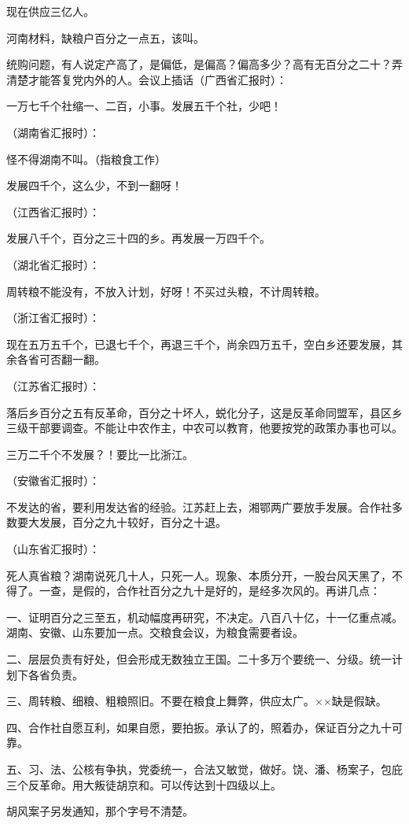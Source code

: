 现在供应三亿人。

河南材料，缺粮户百分之一点五，该叫。

统购问题，有人说定产高了，是偏低，是偏高？偏高多少？高有无百分之二十？弄清楚才能答复党内外的人。会议上插话（广西省汇报时）：

一万七千个社缩一、二百，小事。发展五千个社，少吧！

（湖南省汇报时）：

怪不得湖南不叫。（指粮食工作）

发展四千个，这么少，不到一翻呀！

（江西省汇报时）：

发展八千个，百分之三十四的乡。再发展一万四千个。

（湖北省汇报时）：

周转粮不能没有，不放入计划，好呀！不买过头粮，不计周转粮。

（浙江省汇报时）：

现在五万五千个，已退七千个，再退三千个，尚余四万五千，空白乡还要发展，其余各省可否翻一翻。

（江苏省汇报时）：

落后乡百分之五有反革命，百分之十坏人，蜕化分子，这是反革命同盟军，县区乡三级干部要调查。不能让中农作主，中农可以教育，他要按党的政策办事也可以。

三万二千个不发展？！要比一比浙江。

（安徽省汇报时）：

不发达的省，要利用发达省的经验。江苏赶上去，湘鄂两广要放手发展。合作社多数要大发展，百分之九十较好，百分之十退。

（山东省汇报时）：

死人真省粮？湖南说死几十人，只死一人。现象、本质分开，一股台风天黑了，不得了。一查，是假的，合作社百分之九十是好的，是经多次风的。再讲几点：

一、证明百分之三至五，机动幅度再研究，不决定。八百八十亿，十一亿重点减。湖南、安徽、山东要加一点。交粮食会议，为粮食需要者设。

二、层层负责有好处，但会形成无数独立王国。二十多万个要统一、分级。统一计划下各省负责。

三、周转粮、细粮、粗粮照旧。不要在粮食上舞弊，供应太广。××缺是假缺。

四、合作社自愿互利，如果自愿，要拍扳。承认了的，照着办，保证百分之九十可靠。

五、习、法、公核有争执，党委统一，合法又敏觉，做好。饶、潘、杨案子，包庇三个反革命。用大叛徒胡京和。可以传达到十四级以上。

胡风案子另发通知，那个字号不清楚。


